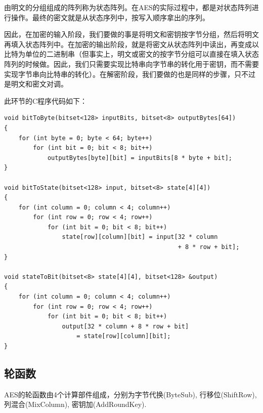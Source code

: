 由明文的分组组成的阵列称为状态阵列。在AES的实际过程中，都是对状态阵列进行操作。最终的密文就是从状态序列中，按写入顺序拿出的序列。\par
因此，在加密的输入阶段，我们要做的事是将明文和密钥按字节分组，然后将明文再填入状态阵列中。在加密的输出阶段，就是将密文从状态阵列中读出，再变成以比特为单位的二进制串（但事实上，明文或密文的按字节分组可以直接在填入状态阵列的时候做。因此，我们只需要实现比特串向字节串的转化用于密钥，而不需要实现字节串向比特串的转化）。在解密阶段，我们要做的也是同样的步骤，只不过是明文和密文对调。\par
此环节的C程序代码如下：
\begin{prove}
\begin{verbatim}
void bitToByte(bitset<128> inputBits, bitset<8> outputBytes[64])
{
    for (int byte = 0; byte < 64; byte++)
        for (int bit = 0; bit < 8; bit++)
            outputBytes[byte][bit] = inputBits[8 * byte + bit];
}

void bitToState(bitset<128> input, bitset<8> state[4][4])
{
    for (int column = 0; column < 4; column++)
        for (int row = 0; row < 4; row++)
            for (int bit = 0; bit < 8; bit++)
                state[row][column][bit] = input[32 * column
                                                + 8 * row + bit];
}

void stateToBit(bitset<8> state[4][4], bitset<128> &output)
{
    for (int column = 0; column < 4; column++)
        for (int row = 0; row < 4; row++)
            for (int bit = 0; bit < 8; bit++)
                output[32 * column + 8 * row + bit]
                    = state[row][column][bit];
}
\end{verbatim}
\end{prove}

\subsection{轮函数}
AES的轮函数由4个计算部件组成，分别为字节代换(ByteSub), 行移位(ShiftRow), 列混合(MixColumn), 密钥加(AddRoundKey).
